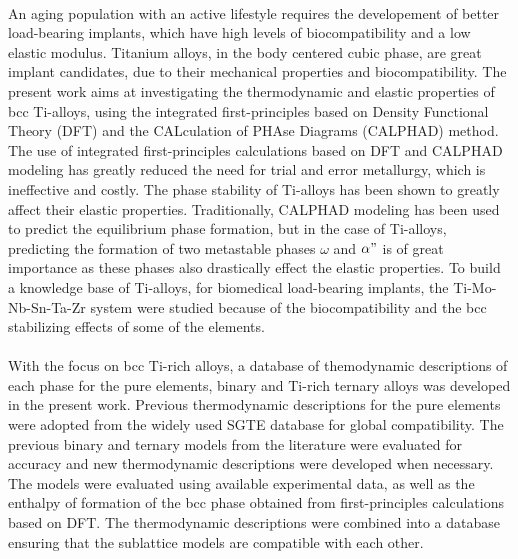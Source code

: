 \paragraph*{} An aging population with an active lifestyle requires the developement of better load-bearing implants, which have high levels of biocompatibility and a low elastic modulus. Titanium alloys, in the body centered cubic phase, are great implant candidates, due to their mechanical properties and biocompatibility. The present work aims at investigating the thermodynamic and elastic properties of bcc Ti-alloys, using the integrated first-principles based on Density Functional Theory (DFT) and the CALculation of PHAse Diagrams (CALPHAD) method. The use of integrated first-principles calculations based on DFT and CALPHAD modeling has greatly reduced the need for trial and error metallurgy, which is ineffective and costly. The phase stability of Ti-alloys has been shown to greatly affect their elastic properties. Traditionally, CALPHAD modeling has been used to predict the equilibrium phase formation, but in the case of Ti-alloys, predicting the formation of two metastable phases $\omega$ and $\alpha"$ is of great importance as these phases also drastically effect the elastic properties. To build a knowledge base of Ti-alloys, for biomedical load-bearing implants, the Ti-Mo-Nb-Sn-Ta-Zr system were studied because of the biocompatibility and the bcc stabilizing effects of some of the elements.
\paragraph*{} With the focus on bcc Ti-rich alloys, a database of themodynamic descriptions of each phase for the pure elements, binary and Ti-rich ternary alloys was developed in the present work. Previous thermodynamic descriptions for the pure elements were adopted from the widely used SGTE database for global compatibility. The previous binary and ternary models from the literature were evaluated for accuracy and new thermodynamic descriptions were developed when necessary. The models were evaluated using available experimental data, as well as the enthalpy of formation of the bcc phase obtained from first-principles calculations based on DFT. The thermodynamic descriptions were combined into a database ensuring that the sublattice models are compatible with each other.
